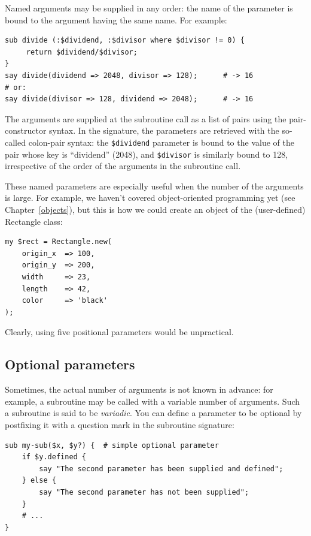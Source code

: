 Named arguments may be supplied in any order: the name of 
the parameter is bound to the argument having the same 
name. For example:

\begin{verbatim}
sub divide (:$dividend, :$divisor where $divisor != 0) {
     return $dividend/$divisor;
}
say divide(dividend => 2048, divisor => 128);      # -> 16
# or:
say divide(divisor => 128, dividend => 2048);      # -> 16
\end{verbatim}

The arguments are supplied at the subroutine call as a list of 
pairs using the pair-constructor syntax. In the signature, 
the parameters are retrieved with the 
so-called colon-pair syntax: the \verb'$dividend' parameter is 
bound to the value of the pair whose key is ``dividend'' (2048), 
and \verb'$divisor' is similarly bound to 128, irrespective of 
the order of the arguments in the subroutine call.

These named parameters are especially useful when the number of 
the arguments is large. For example, we haven't covered 
object-oriented programming yet (see Chapter~\ref{objects}), 
but this is how we could create an object of the 
(user-defined) Rectangle class:

\begin{verbatim}
my $rect = Rectangle.new( 
    origin_x  => 100, 
    origin_y  => 200, 
    width     => 23,
    length    => 42,
    color     => 'black'
);
\end{verbatim}

Clearly, using five positional parameters would be unpractical. 

\subsection{Optional parameters}

Sometimes, the actual number of arguments is not known 
in advance: for example, a subroutine may be called with 
a variable number of arguments. Such a subroutine is said 
to be \emph{variadic}. You can define a parameter to be 
optional by postfixing it with a question mark in the 
subroutine signature:

\begin{verbatim}
sub my-sub($x, $y?) {  # simple optional parameter
    if $y.defined {
        say "The second parameter has been supplied and defined";
    } else {
        say "The second parameter has not been supplied";
    }
    # ...
}
\end{verbatim}

